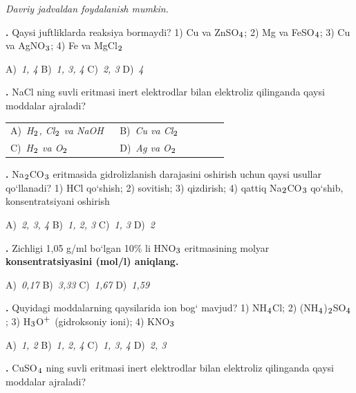 \documentclass[11pt,a4paper]{article}
\renewcommand{\normalsize}{\fontsize{10.9}{13.4}\selectfont}
\renewcommand{\textsubscript}[1]{\ensuremath{_{\text{\fontsize{8}{8}\selectfont #1}}}}
\renewcommand{\textsuperscript}[1]{\ensuremath{^{\text{\fontsize{8}{8}\selectfont #1}}}}
\newcommand{\qn}[1]{\textbf{\fontsize{11.5}{13}\selectfont #1}}
\newcommand{\qsep}{\par\vspace{13pt}}
\begin{document}
\normalsize
\thispagestyle{first}
\noindent\textit{Davriy jadvaldan foydalanish mumkin.}
\par\smallskip
\begin{multicols}{2}
\noindent\qn{1.} Qaysi juftliklarda reaksiya bormaydi? 1) Cu va ZnSO\textsubscript{4}; 2) Mg va FeSO\textsubscript{4}; 3) Cu va AgNO\textsubscript{3}; 4) Fe va MgCl\textsubscript{2}

\noindent A)~\textsl{1, 4} \hfill B)~\textsl{1, 3, 4} \hfill C)~\textsl{2, 3} \hfill D)~\textsl{4}\par
\qsep
\noindent\qn{2.} NaCl ning suvli eritmasi inert elektrodlar bilan elektroliz qilinganda qaysi moddalar ajraladi?

\noindent\begin{tabular}{@{}p{0.47\linewidth}@{}p{0.47\linewidth}@{}}
A)~\textsl{H\textsubscript{2}, Cl\textsubscript{2} va NaOH} & B)~\textsl{Cu va Cl\textsubscript{2}} \\
C)~\textsl{H\textsubscript{2} va O\textsubscript{2}} & D)~\textsl{Ag va O\textsubscript{2}} \\
\end{tabular}\par
\qsep
\noindent\qn{3.} Na\textsubscript{2}CO\textsubscript{3} eritmasida gidrolizlanish darajasini oshirish uchun qaysi usullar qo`llanadi? 1) HCl qo`shish; 2) sovitish; 3) qizdirish; 4) qattiq Na\textsubscript{2}CO\textsubscript{3} qo`shib, konsentratsiyani oshirish

\noindent A)~\textsl{2, 3, 4} \hfill B)~\textsl{1, 2, 3} \hfill C)~\textsl{1, 3} \hfill D)~\textsl{2}\par
\qsep
\noindent\qn{4.} Zichligi 1,05 g/ml bo`lgan 10\% li HNO\textsubscript{3} eritmasining molyar \textbf{konsentratsiyasini (mol/l) aniqlang.}

\noindent A)~\textsl{0,17} \hfill B)~\textsl{3,33} \hfill C)~\textsl{1,67} \hfill D)~\textsl{1,59}\par
\qsep
\noindent\qn{5.} Quyidagi moddalarning qaysilarida ion bog` mavjud? 1) NH\textsubscript{4}Cl; 2) (NH\textsubscript{4})\textsubscript{2}SO\textsubscript{4}; 3) H\textsubscript{3}O\textsuperscript{+} (gidroksoniy ioni); 4) KNO\textsubscript{3}

\noindent A)~\textsl{1, 2} \hfill B)~\textsl{1, 2, 4} \hfill C)~\textsl{1, 3, 4} \hfill D)~\textsl{2, 3}\par
\qsep
\noindent\qn{6.} CuSO\textsubscript{4} ning suvli eritmasi inert elektrodlar bilan elektroliz qilinganda qaysi moddalar ajraladi?


\end{multicols}
\end{document}
